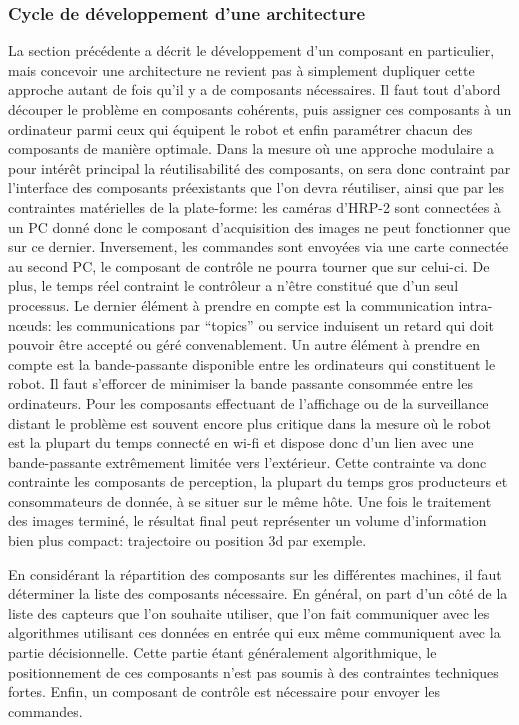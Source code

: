 \subsubsection{Cycle de développement d'une architecture}


La section précédente a décrit le développement d'un composant en
particulier, mais concevoir une architecture ne revient pas à
simplement dupliquer cette approche autant de fois qu'il y a de
composants nécessaires. Il faut tout d'abord découper le problème en
composants cohérents, puis assigner ces composants à un ordinateur
parmi ceux qui équipent le robot et enfin paramétrer chacun des
composants de manière optimale. Dans la mesure où une approche
modulaire a pour intérêt principal la réutilisabilité des composants,
on sera donc contraint par l'interface des composants préexistants que
l'on devra réutiliser, ainsi que par les contraintes matérielles de la
plate-forme: les caméras d'HRP-2 sont connectées à un PC donné donc le
composant d'acquisition des images ne peut fonctionner que sur ce
dernier. Inversement, les commandes sont envoyées via une carte
connectée au second PC, le composant de contrôle ne pourra tourner que
sur celui-ci. De plus, le temps réel contraint le contrôleur a n'être
constitué que d'un seul processus. Le dernier élément à prendre en
compte est la communication intra-n\oe uds: les communications par
``topics'' ou service induisent un retard qui doit pouvoir être
accepté ou géré convenablement. Un autre élément à prendre en compte
est la bande-passante disponible entre les ordinateurs qui constituent
le robot. Il faut s'efforcer de minimiser la bande passante consommée
entre les ordinateurs. Pour les composants effectuant de l'affichage
ou de la surveillance distant le problème est souvent encore plus
critique dans la mesure où le robot est la plupart du temps connecté
en wi-fi et dispose donc d'un lien avec une bande-passante extrêmement
limitée vers l'extérieur. Cette contrainte va donc contrainte les
composants de perception, la plupart du temps gros producteurs et
consommateurs de donnée, à se situer sur le même hôte. Une fois le
traitement des images terminé, le résultat final peut représenter un
volume d'information bien plus compact: trajectoire ou position 3d par
exemple.


En considérant la répartition des composants sur les différentes
machines, il faut déterminer la liste des composants nécessaire. En
général, on part d'un côté de la liste des capteurs que l'on souhaite
utiliser, que l'on fait communiquer avec les algorithmes utilisant ces
données en entrée qui eux même communiquent avec la partie
décisionnelle. Cette partie étant généralement algorithmique, le
positionnement de ces composants n'est pas soumis à des contraintes
techniques fortes. Enfin, un composant de contrôle est nécessaire pour
envoyer les commandes.


